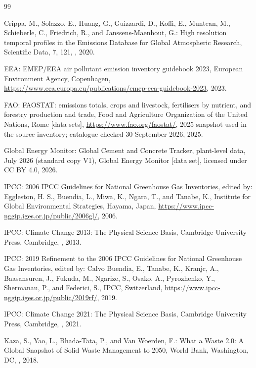 \documentclass[essd]{copernicus}
\begin{document}
\begin{thebibliography}{99}

Crippa, M., Solazzo, E., Huang, G., Guizzardi, D., Koffi, E., Muntean, M., Schieberle, C., Friedrich, R., and Janssens-Maenhout, G.: High resolution temporal profiles in the Emissions Database for Global Atmospheric Research, Scientific Data, 7, 121, , 2020.

EEA: EMEP/EEA air pollutant emission inventory guidebook 2023, European Environment Agency, Copenhagen, \url{https://www.eea.europa.eu/publications/emep-eea-guidebook-2023}, 2023.

FAO: FAOSTAT: emissions totals, crops and livestock, fertilisers by nutrient, and forestry production and trade, Food and Agriculture Organization of the United Nations, Rome [data sets], \url{https://www.fao.org/faostat/}, 2025 snapshot used in the source inventory; catalogue checked 30 September 2026, 2025.

Global Energy Monitor: Global Cement and Concrete Tracker, plant-level data, July 2026 (standard copy V1), Global Energy Monitor [data set], licensed under CC BY 4.0, 2026.

IPCC: 2006 IPCC Guidelines for National Greenhouse Gas Inventories, edited by: Eggleston, H. S., Buendia, L., Miwa, K., Ngara, T., and Tanabe, K., Institute for Global Environmental Strategies, Hayama, Japan, \url{https://www.ipcc-nggip.iges.or.jp/public/2006gl/}, 2006.

IPCC: Climate Change 2013: The Physical Science Basis, Cambridge University Press, Cambridge, , 2013.

IPCC: 2019 Refinement to the 2006 IPCC Guidelines for National Greenhouse Gas Inventories, edited by: Calvo Buendia, E., Tanabe, K., Kranjc, A., Baasansuren, J., Fukuda, M., Ngarize, S., Osako, A., Pyrozhenko, Y., Shermanau, P., and Federici, S., IPCC, Switzerland, \url{https://www.ipcc-nggip.iges.or.jp/public/2019rf/}, 2019.

IPCC: Climate Change 2021: The Physical Science Basis, Cambridge University Press, Cambridge, , 2021.

Kaza, S., Yao, L., Bhada-Tata, P., and Van Woerden, F.: What a Waste 2.0: A Global Snapshot of Solid Waste Management to 2050, World Bank, Washington, DC, , 2018.


\end{thebibliography}
\end{document}

